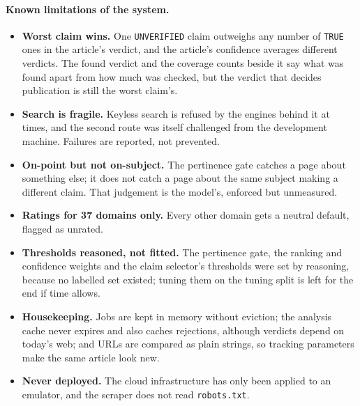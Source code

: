 \paragraph{Known limitations of the system.}
\begin{itemize}
    \item \textbf{Worst claim wins.} One \texttt{UNVERIFIED} claim
    outweighs any number of \texttt{TRUE} ones in the article's verdict,
    and the article's confidence averages different verdicts. The found
    verdict and the coverage counts beside it say what was found apart
    from how much was checked, but the verdict that decides publication
    is still the worst claim's.
    \item \textbf{Search is fragile.} Keyless search is refused by the
    engines behind it at times, and the second route was itself
    challenged from the development machine. Failures are reported, not
    prevented.
    \item \textbf{On-point but not on-subject.} The pertinence gate
    catches a page about something else; it does not catch a page about
    the same subject making a different claim. That judgement is the
    model's, enforced but unmeasured.
    \item \textbf{Ratings for 37 domains only.} Every other domain gets a
    neutral default, flagged as unrated.
    \item \textbf{Thresholds reasoned, not fitted.} The pertinence gate,
    the ranking and confidence weights and the claim selector's
    thresholds were set by reasoning, because no labelled set existed;
    tuning them on the tuning split is left for the end if time allows.
    \item \textbf{Housekeeping.} Jobs are kept in memory without
    eviction; the analysis cache never expires and also caches
    rejections, although verdicts depend on today's web; and URLs are
    compared as plain strings, so tracking parameters make the same
    article look new.
    \item \textbf{Never deployed.} The cloud infrastructure has only been
    applied to an emulator, and the scraper does not read
    \texttt{robots.txt}.
\end{itemize}
